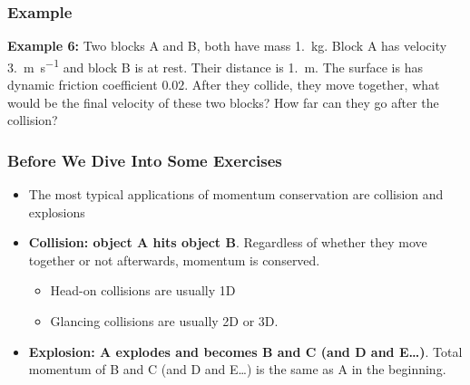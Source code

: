 \documentclass[12pt,compress,aspectratio=169]{beamer}
\begin{document}
\begin{frame}
  \frametitle{Example}
  \textbf{Example 6:} Two blocks A and B, both have mass \SI{1.}{\kilo\gram}.
  Block A has velocity \SI{3.}{\metre\per\second} and block B is at rest. Their
  distance is \SI{1.}{\metre}. The surface is has dynamic friction coefficient
  $0.02$. After they collide, they move together, what would be the final
  velocity of these two blocks? How far can they go after the collision?
\end{frame}

%
\begin{frame}
  \frametitle{Before We Dive Into Some Exercises}
  \begin{itemize}
  \item The most typical applications of momentum conservation are collision
    and explosions
  \item\textbf{Collision: object A hits object B}. Regardless of whether they
    move together or not afterwards, momentum is conserved.
    \begin{itemize}
    \item Head-on collisions are usually 1D
    \item Glancing collisions are usually 2D or 3D.
    \end{itemize}
  \item\textbf{Explosion: A explodes and becomes B and C (and D and E\ldots)}.
    Total momentum of B and C (and D and E\ldots) is the same as A in the
    beginning. 
  \end{itemize}
\end{frame}
\end{document}
